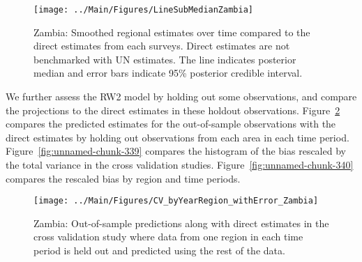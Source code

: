 \documentclass[12pt]{article}\usepackage[]{graphicx}\usepackage[]{color}
\newenvironment{knitrout}{}{} %
\begin{document}
\begin{knitrout}
\color{fgcolor}\begin{figure}[bht]

{\centering \texttt{[image: ../Main/Figures/LineSubMedianZambia]} 

}

\caption[Zambia]{Zambia: Smoothed regional estimates over time compared to the direct estimates from each surveys. Direct estimates are not benchmarked with UN estimates. The line indicates posterior median and error bars indicate 95\% posterior credible interval.}\label{fig:unnamed-chunk-337}
\end{figure}


\end{knitrout}
We further assess the RW2 model by holding out some observations, and compare the projections to the direct estimates in these holdout observations. Figure~\ref{fig:unnamed-chunk-338} compares the predicted estimates for the out-of-sample observations  with the direct estimates by holding out observations from each area in each time period.  Figure~\ref{fig:unnamed-chunk-339} compares the histogram of the bias rescaled by the total variance in the cross validation studies. Figure~\ref{fig:unnamed-chunk-340} compares the rescaled bias by region and time periods.



 
\begin{knitrout}
\color{fgcolor}\begin{figure}[bht]

{\centering \texttt{[image: ../Main/Figures/CV\_byYearRegion\_withError\_Zambia]} 

}

\caption[Zambia]{Zambia: Out-of-sample predictions along with direct estimates in the cross validation study where data from one region in each time period is held out and predicted using the rest of the data.}\label{fig:unnamed-chunk-338}
\end{figure}


\end{knitrout}
\end{document}
